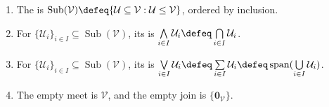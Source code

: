\begin{definition} \label{def:subspace-meet-and-join} 
\begin{enumerate}[label=(\roman*)]
\setlength{\itemsep}{0pt}
\item The  is $\operatorname{Sub}(\mathcal{V})\defeq\{\mathcal{U}\subseteq\mathcal{V}:\mathcal{U}\leq\mathcal{V}\}$, ordered by inclusion.
\item For $\{\mathcal{U}_i\}_{i\in I}\subseteq\operatorname{Sub}(\mathcal{V})$, its  is $\bigwedge\limits_{i\in I}\mathcal{U}_i\defeq\bigcap\limits_{i\in I}\mathcal{U}_i$.
\item For $\{\mathcal{U}_i\}_{i\in I}\subseteq\operatorname{Sub}(\mathcal{V})$, its  is $\bigvee\limits_{i\in I}\mathcal{U}_i\defeq\sum\limits_{i\in I}\mathcal{U}_i\defeq\operatorname{span}(\bigcup\limits_{i\in I}\mathcal{U}_i)$.
\item The empty meet is $\mathcal{V}$, and the empty join is $\{\mathbf{0}_{\mathcal{V}}\}$.
\end{enumerate}
\end{definition}

